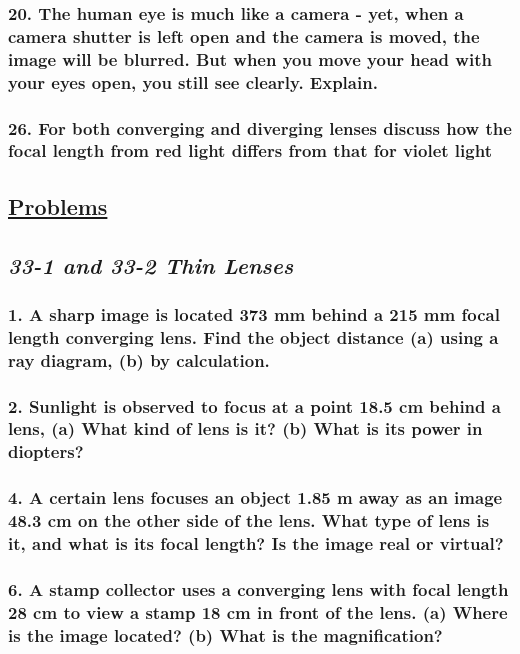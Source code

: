 \documentclass{article}
\begin{document}
\subsubsection*{
    20. The human eye is much like a camera - yet, when a camera shutter is left open
    and the camera is moved, the image will be blurred. But when you move your head
    with your eyes open, you still see clearly. Explain.
}
\subsubsection*{
    26. For both converging and diverging lenses discuss how the focal length
        from red light differs from that for violet light 
}
\newpage
\begin{center}
    \section*{\textbf{\underline {Problems}}}
    \subsection*{\textbf{\textit{33-1 and 33-2 Thin Lenses}}}
\end{center}
\subsubsection*{
    1. A sharp image is located 373 mm behind a 215 mm focal length converging lens.
    Find the object distance (a) using a ray diagram, (b) by calculation.
}
\subsubsection*{
    2. Sunlight is observed to focus at a point 18.5 cm behind a lens, (a) What kind
    of lens is it? (b) What is its power in diopters?
}
\subsubsection*{
    4. A certain lens focuses an object 1.85 m away as an image 48.3 cm on the other
    side of the lens. What type of lens is it, and what is its focal length?
    Is the image real or virtual?
}
\subsubsection*{
    6. A stamp collector uses a converging lens with focal length 28 cm to view a stamp
    18 cm in front of the lens. (a) Where is the image located? (b) What is the magnification?
}
\end{document}
